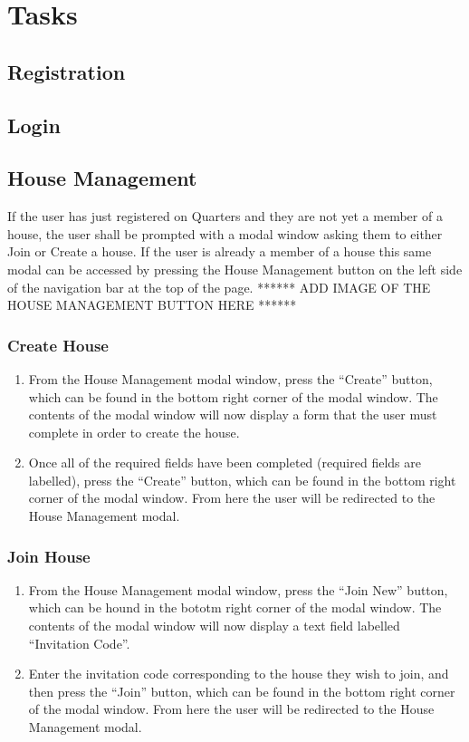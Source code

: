 \documentclass[12pt]{article}
\begin{document}
\section{Tasks}

\subsection{Registration}
\subsection{Login}

\subsection{House Management} %
If the user has just registered on Quarters and they are not yet a member of a house,
the user shall be prompted with a modal window asking them to either Join or Create a house.
If the user is already a member of a house this same modal can be accessed by pressing the
House Management button on the  left side of the navigation bar at the top of the page.
****** ADD IMAGE OF THE HOUSE MANAGEMENT BUTTON HERE ******

\subsubsection{Create House}
\begin{enumerate}
\item From the House Management modal window, press the ``Create'' button, which can be found in the bottom right corner of the modal window. The contents of the modal window will now display a form that the user must complete in order to create the house.
\item Once all of the required fields have been completed (required fields are labelled), press the ``Create'' button, which can be found in the bottom right corner of the modal window. From here the user will be redirected to the House Management modal.
\end{enumerate}

\subsubsection{Join House}
\begin{enumerate}
\item From the House Management modal window, press the ``Join New'' button, which can be hound in the bototm right corner of the modal window. The contents of the modal window will now display a text field labelled ``Invitation Code''.
\item Enter the invitation code corresponding to the house they wish to join, and then press the ``Join'' button, which can be found in the bottom right corner of the modal window. From here the user will be redirected to the House Management modal.
\end{enumerate}
\end{document}
